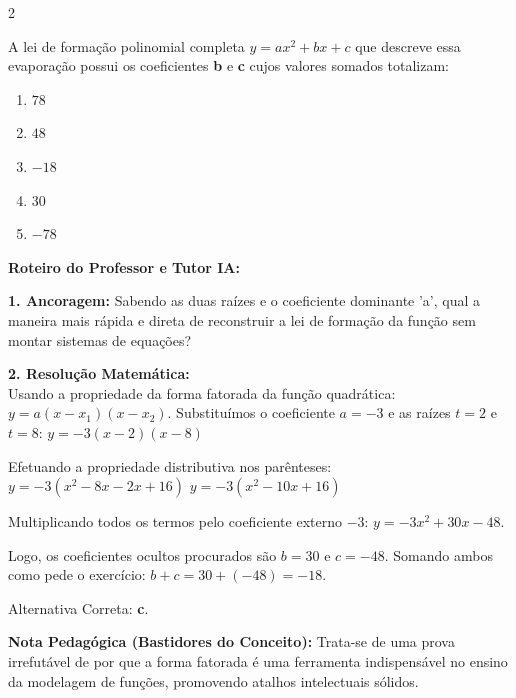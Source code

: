 \begin{multicols*}{2}
\begin{enunciadoLiteral}
A lei de formação polinomial completa $y = ax^2 + bx + c$ que descreve essa evaporação possui os coeficientes \textbf{b} e \textbf{c} cujos valores somados totalizam:

\begin{enumerate}[label=\alph*), itemsep=\espacoAlt]
    \item $78$
    \item $48$
    \item $-18$
    \item $30$
    \item $-78$
\end{enumerate}
\end{enunciadoLiteral}

\ifgabarito
    \begin{tcolorbox}[colback=CorTitUm!5, colframe=CorTitUm, boxrule=1pt, arc=4pt, left=6pt, right=6pt, top=6pt, bottom=6pt]
    \small\textbf{\textcolor{CorTitUm}{Roteiro do Professor e Tutor IA:}}\par\vspace{0.1cm}
    \color{CinzaEscuro}
    \textbf{1. Ancoragem:} Sabendo as duas raízes e o coeficiente dominante 'a', qual a maneira mais rápida e direta de reconstruir a lei de formação da função sem montar sistemas de equações?\par\vspace{0.1cm}
    \textbf{2. Resolução Matemática:}\\
    Usando a propriedade da forma fatorada da função quadrática: $y = a(x - x_1)(x - x_2)$.
    Substituímos o coeficiente $a = -3$ e as raízes $t=2$ e $t=8$:
    $y = -3(x - 2)(x - 8)$
    
    Efetuando a propriedade distributiva nos parênteses:
    $y = -3(x^2 - 8x - 2x + 16)$
    $y = -3(x^2 - 10x + 16)$
    
    Multiplicando todos os termos pelo coeficiente externo $-3$:
    $y = -3x^2 + 30x - 48$.
    
    Logo, os coeficientes ocultos procurados são $b = 30$ e $c = -48$.
    Somando ambos como pede o exercício: $b + c = 30 + (-48) = -18$.
    
    Alternativa Correta: \textbf{c}.
    \end{tcolorbox}
    \vspace{0.15cm}
    
    \begin{boxexplicacao}
    \textbf{Nota Pedagógica (Bastidores do Conceito):} Trata-se de uma prova irrefutável de por que a forma fatorada é uma ferramenta indispensável no ensino da modelagem de funções, promovendo atalhos intelectuais sólidos.
    \end{boxexplicacao}
\fi


\end{multicols*}

